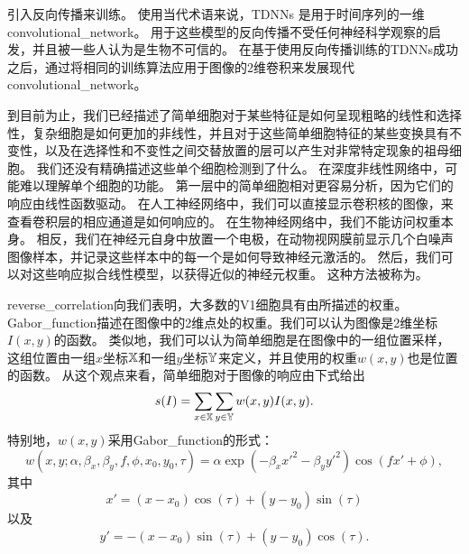 \cite{Lang+Hinton88}引入反向传播来训练。
使用当代术语来说，TDNNs 是用于时间序列的一维\gls{convolutional_network}。
用于这些模型的反向传播不受任何神经科学观察的启发，并且被一些人认为是生物不可信的。
在基于使用反向传播训练的TDNNs成功之后，\cite{LeCun89d}通过将相同的训练算法应用于图像的2维卷积来发展现代\gls{convolutional_network}。

到目前为止，我们已经描述了简单细胞对于某些特征是如何呈现粗略的线性和选择性，复杂细胞是如何更加的非线性，并且对于这些简单细胞特征的某些变换具有不变性，以及在选择性和不变性之间交替放置的层可以产生对非常特定现象的祖母细胞。
我们还没有精确描述这些单个细胞检测到了什么。
在深度非线性网络中，可能难以理解单个细胞的功能。
第一层中的简单细胞相对更容易分析，因为它们的响应由线性函数驱动。
在人工神经网络中，我们可以直接显示卷积核的图像，来查看卷积层的相应通道是如何响应的。
在生物神经网络中，我们不能访问权重本身。
相反，我们在神经元自身中放置一个电极，在动物视网膜前显示几个白噪声图像样本，并记录这些样本中的每一个是如何导致神经元激活的。
然后，我们可以对这些响应拟合线性模型，以获得近似的神经元权重。
这种方法被称为\citep{ringach2004reverse}。
 
 
\gls{reverse_correlation}向我们表明，大多数的V1细胞具有由所描述的权重。
\gls{Gabor_function}描述在图像中的2维点处的权重。我们可以认为图像是2维坐标$I(x,y)$的函数。
类似地，我们可以认为简单细胞是在图像中的一组位置采样，这组位置由一组$x$坐标$\mathbb{X}$和一组$y$坐标$\mathbb{Y}$来定义，并且使用的权重$w(x,y)$也是位置的函数。
从这个观点来看，简单细胞对于图像的响应由下式给出
\begin{equation}
  s(I)=\sum_{x\in \mathbb{X}} \sum_{y\in \mathbb{Y}} w(x, y)I(x,y).
\end{equation}
特别地，$w(x,y)$采用\gls{Gabor_function}的形式：
\begin{equation}
  w(x, y; \alpha, \beta_x, \beta_y, f, \phi, x_0, y_0, \tau) = \alpha \exp(-\beta_x x'^2 - \beta_y y'^2) \cos (fx' + \phi),
\end{equation}
其中
\begin{equation}
  x' = (x-x_0)\cos(\tau) + (y-y_0)\sin(\tau)
\end{equation}
以及
\begin{equation}
  y' = -(x-x_0) \sin(\tau) + (y-y_0)\cos(\tau).
\end{equation}

